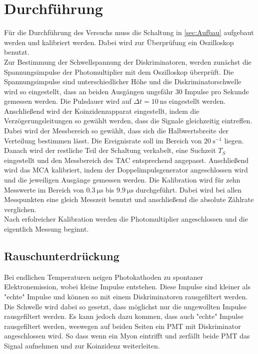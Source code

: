 \section{Durchführung}
\label{sec:Durchführung}
Für die Durchführung des Versuchs muss die Schaltung in \autoref{sec:Aufbau} aufgebaut werden und kalibriert werden.
Dabei wird zur Überprüfung ein Oszilloskop benutzt.\\
Zur Bestimmung der Schwellspannung der Diskriminatoren, werden zunächst die Spannungsimpulse der Photomultiplier mit dem Oszilloskop überprüft.
Die Spannungsimpulse sind unterschiedlicher Höhe und die Diskriminatorschwelle wird so eingestellt, dass an beiden Ausgängen ungefähr $30$ Impulse pro Sekunde gemessen werden.
Die Pulsdauer wird auf $\Delta t = \qty{10}{\nano\second}$ eingestellt werden.\\
Anschließend wird der Koinzidenzapparat eingestellt, indem die Verzögerungsleitungen so gewählt werden, dass die Signale gleichzeitig eintreffen. Dabei wird der Messbereich so gewählt,
dass sich die Halbwertsbreite der Verteilung bestimmen lässt. Die Ereignisrate soll im Bereich von $\qty{20}{\second^{-1}}$ liegen.\\
Danach wird der restliche Teil der Schaltung verkabelt, eine Suchzeit $T_S$ eingestellt und den Messbereich des TAC entsprechend angepasst.
Anschließend wird das MCA kalibriert, indem der Doppelimpulsgenerator angeschlossen wird und die jeweiligen Ausgänge gemessen werden. Die Kalibration wird für zehn Messwerte im Bereich von
$\qty{0.3}{\micro\second}$ bis  $\qty{9.9}{\micro\second}$ durchgeführt. Dabei wird bei allen Messpunkten eine gleich Messzeit benutzt und anschließend die absolute Zählrate verglichen.\\
Nach erfolreicher Kalibration werden die Photomultiplier angeschlossen und die eigentlich Messung beginnt.

\subsection{Rauschunterdrückung}
\label{subsec:Rauschunterdrückung}
Bei endlichen Temperaturen neigen Photokathoden zu spontaner Elektronemission, wobei kleine Impulse entstehen.
Diese Impulse sind kleiner als "echte" Impulse und können so mit einem Diskriminatoren rausgefiltert werden. Die Schwelle wird
dabei so gesetzt, dass möglichst nur die ungewollten Impulse rausgefiltert werden. Es kann jedoch dazu kommen, dass auch "echte"
Impulse rausgefiltert werden, weswegen auf beiden Seiten ein PMT mit Diskriminator angeschlossen wird. 
So dass wenn ein Myon eintrifft und zerfällt beide PMT das Signal aufnehmen und zur Koinzidenz weiterleiten.

